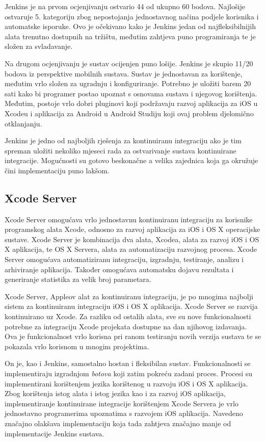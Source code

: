 \documentclass[times, utf8, diplomski, numeric]{fer}
\begin{document}
\begin{appendices}
Jenkins je na prvom ocjenjivanju ostvario 44 od ukupno 60 bodova. Najlošije ostvaruje 5. kategoriju zbog nepostojanja jednostavnog načina podjele korisnika i automatske isporuke. Ovo je očekivano kako je Jenkins jedan od najfleksibilnijih alata trenutno dostupnih na tržištu, međutim zahtjeva puno programiranja te je složen za svladavanje.

Na drugom ocjenjivanju je sustav ocijenjen puno lošije. Jenkins je skupio 11/20 bodova iz perspektive mobilnih sustava. Sustav je jednostavan za korištenje, međutim vrlo složen za ugradnju i konfiguriranje. Potrebno je uložiti barem 20 sati kako bi programer postao upoznat s osnovama sustava i njegovog korištenja. Međutim, postoje vrlo dobri pluginovi koji podržavaju razvoj aplikacija za iOS u Xcodeu i aplikacija za Android u Android Studiju koji ovaj problem djelomično otklanjanju.

Jenkins je jedno od najboljih rješenja za kontinuiranu integraciju ako je tim spreman uložiti nekoliko mjeseci rada za ostvarivanje sustava kontinuirane integracije. Mogućnosti su gotovo beskonačne a velika zajednica koja ga okružuje čini implementaciju puno lakšom.

\subsection{Xcode Server}

Xcode Server omogućava vrlo jednostavnu kontinuiranu integraciju za korisnike programskog alata Xcode, odnosno za razvoj aplikacija za iOS i OS X operacijske sustave. Xcode Server je kombinacija dva alata, Xcodea, alata za razvoj iOS i OS X aplikacija, te OS X Servera, alata za automatizaciju razvojnog procesa. Xcode Server omogućava automatiziranu integraciju, izgradnju, testiranje, analizu i arhiviranje aplikacija. Također omogućava automatsku dojavu rezultata i generiranje statistika za velik broj parametara.

Xcode Server, Appleov alat za kontinuiranu integraciju, je po mnogima najbolji sistem za kontinuiranu integraciju iOS i OS X aplikacija. Xcode Server se razvija kontinuirano uz Xcode. Za razliku od ostalih alata, sve su nove funkcionalnosti potrebne za integraciju Xcode projekata dostupne na dan njihovog izdavanja. Ova je funkcionalnost vrlo korisna pri ranom testiranju novih verzija sustava te se pokazala vrlo korisnom u mnogim projektima.

On je, kao i Jenkins, samostalno hostan i fleksibilan sustav. Funkcionalnosti se implementiraju izgradnjom \textit{botova} koji zatim pokreću zadani proces. Procesi su implementirani korištenjem jezika korištenog u razvoju iOS i OS X aplikacija. Zbog korištenja istog alata i istog jezika kao i za razvoj iOS aplikacija, implementiranje kontinuirane integracije korištenjem Xcode Servera je vrlo jednostavno programerima upoznatima s razvojem iOS aplikacija. Navedeno značajno olakšava implementaciju koja tada zahtjeva značajno manje od implementacije Jenkins sustava.


\end{appendices}
\end{document}

